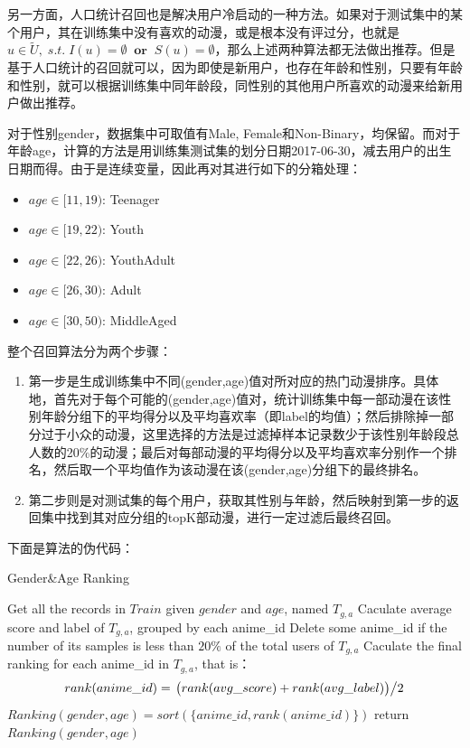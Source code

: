 另一方面，人口统计召回也是解决用户冷启动的一种方法。如果对于测试集中的某个用户，其在训练集中没有喜欢的动漫，或是根本没有评过分，也就是$u\in\tilde{U},\;s.t.\;I(u)=\emptyset\;\;\textbf{or}\;\;S(u)=\emptyset$，那么上述两种算法都无法做出推荐。但是基于人口统计的召回就可以，因为即使是新用户，也存在年龄和性别，只要有年龄和性别，就可以根据训练集中同年龄段，同性别的其他用户所喜欢的动漫来给新用户做出推荐。

对于性别gender，数据集中可取值有Male, Female和Non-Binary，均保留。而对于年龄age，计算的方法是用训练集测试集的划分日期2017-06-30，减去用户的出生日期而得。由于是连续变量，因此再对其进行如下的分箱处理：
\begin{itemize}
	\item $age\in[11,19)$: Teenager
	\item $age\in[19,22)$: Youth
	\item $age\in[22,26)$: YouthAdult
	\item $age\in[26,30)$: Adult
	\item $age\in[30,50)$: MiddleAged
\end{itemize}
整个召回算法分为两个步骤：
\begin{enumerate}
	\item 第一步是生成训练集中不同(gender,age)值对所对应的热门动漫排序。具体地，首先对于每个可能的(gender,age)值对，统计训练集中每一部动漫在该性别年龄分组下的平均得分以及平均喜欢率（即label的均值）；然后排除掉一部分过于小众的动漫，这里选择的方法是过滤掉样本记录数少于该性别年龄段总人数的20\%的动漫；最后对每部动漫的平均得分以及平均喜欢率分别作一个排名，然后取一个平均值作为该动漫在该(gender,age)分组下的最终排名。
	\item 第二步则是对测试集的每个用户，获取其性别与年龄，然后映射到第一步的返回集中找到其对应分组的topK部动漫，进行一定过滤后最终召回。
\end{enumerate}
下面是算法的伪代码：
\begin{algorithm}[htbp]
	\caption{Gender\&Age Ranking}
	Get all the records in $Train$ given $gender$ and $age$, named $T_{g,a}$\;
	Caculate average score and label of $T_{g,a}$, grouped by each anime\_id\;
	Delete some anime\_id if the number of its samples is less than $20\%$ of the total users of $T_{g,a}$\;
	Caculate the final ranking for each anime\_id in $T_{g,a}$, that is：
	$$rank(anime\_id) = \left.\big(rank(avg\_score)+rank(avg\_label)\big)\middle/2\right.$$\;
	$Ranking(gender,age) = sort(\{anime\_id,rank(anime\_id)\})$\;
	return $Ranking(gender,age)$\;
\end{algorithm}

